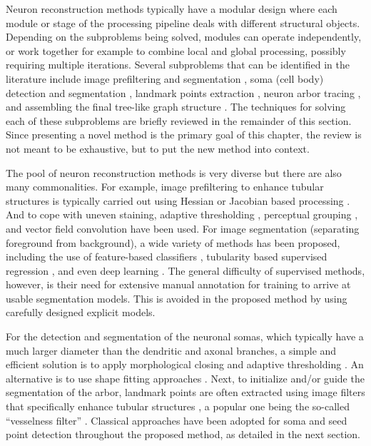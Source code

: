 Neuron reconstruction methods typically have a modular design where each module or stage of the processing pipeline deals with different structural objects. Depending on the subproblems being solved, modules can operate independently, or work together for example to combine local and global processing, possibly requiring multiple iterations. Several subproblems that can be identified in the literature include image prefiltering and segmentation \cite{zhou2015adaptive, turetken2011automated, sironi2016multiscale, mukherjee2013vector}, soma (cell body) detection and segmentation \cite{quan2013neurogps}, landmark points extraction \cite{al2008improved, wang2011broadly, choromanska2012automatic, su2012junction, radojevic2016fuzzy}, neuron arbor tracing \cite{zhao2011automated, liu2016rivulet, leandro2009automatic, radojevic2017automated, xiao2013app2}, and assembling the final tree-like graph structure \cite{zhou2016tremap, turetken2011automated, yuan2009mdl}. The techniques for solving each of these subproblems are briefly reviewed in the remainder of this section. Since presenting a novel method is the primary goal of this chapter, the review is not meant to be exhaustive, but to put the new method into context.

The pool of neuron reconstruction methods is very diverse \cite{meijering2010neuron, donohue2011automated, acciai2016automated, peng2015bigneuron} but there are also many commonalities. For example, image prefiltering to enhance tubular structures is typically carried out using Hessian or Jacobian based processing \cite{xiong2006automated, al2008improved, yuan2009mdl, wang2011broadly}. And to cope with uneven staining, adaptive thresholding \cite{zhou2015adaptive}, perceptual grouping \cite{narayanaswamy20113}, and vector field convolution \cite{mukherjee2015tubularity} have been used. For image segmentation (separating foreground from background), a wide variety of methods has been proposed, including the use of feature-based classifiers \cite{turetken2011automated, chen2015smarttracing, jimenez2015improved}, tubularity based supervised regression \cite{sironi2016multiscale}, and even deep learning \cite{li2017deep}. The general difficulty of supervised methods, however, is their need for extensive manual annotation for training to arrive at usable segmentation models. This is avoided in the proposed method by using carefully designed explicit models.

For the detection and segmentation of the neuronal somas, which typically have a much larger diameter than the dendritic and axonal branches, a simple and efficient solution is to apply morphological closing and adaptive thresholding \cite{yan2013automated}. An alternative is to use shape fitting approaches \cite{quan2013neurogps}. Next, to initialize and/or guide the segmentation of the arbor, landmark points are often extracted using image filters that specifically enhance tubular structures \cite{wang2011broadly, turetken2011automated, choromanska2012automatic, su2012junction, radojevic2016fuzzy}, a popular one being the so-called ``vesselness filter'' \cite{frangi1998multiscale}. Classical approaches have been adopted for soma and seed point detection throughout the proposed method, as detailed in the next section.

